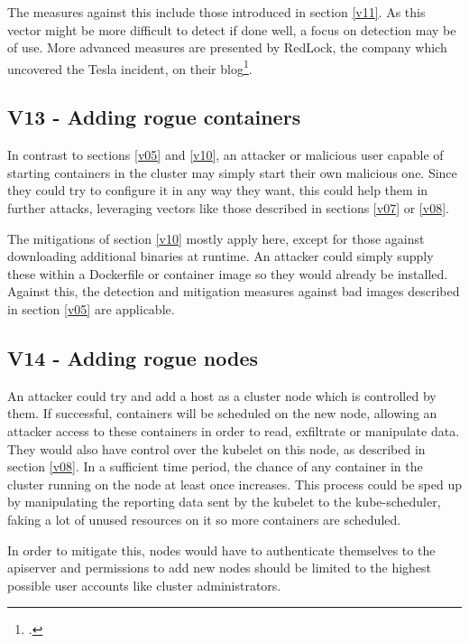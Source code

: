 The measures against this include those introduced in section \ref{v11}. As this vector might be more difficult to detect if done well, a focus on detection may be of use.
More advanced measures are presented by RedLock, the company which uncovered the Tesla incident, on their blog\footcite[][, section 'Preventing Such Compromises']{teslaIncident}.

\subsection{V13 - Adding rogue containers} \label{v13}
In contrast to sections \ref{v05} and \ref{v10}, an attacker or malicious user capable of starting containers in the cluster may simply start their own malicious one. Since they could try to configure it in any way they want, this could help them in further attacks, leveraging vectors like those described in sections \ref{v07} or \ref{v08}.

The mitigations of section \ref{v10} mostly apply here, except for those against downloading additional binaries at runtime. An attacker could simply supply these within a Dockerfile or container image so they would already be installed. Against this, the detection and mitigation measures against bad images described in section \ref{v05} are applicable.

\subsection{V14 - Adding rogue nodes}
An attacker could try and add a host as a cluster node which is controlled by them. If successful, containers will be scheduled on the new node, allowing an attacker access to these containers in order to read, exfiltrate or manipulate data. They would also have control over the kubelet on this node, as described in section \ref{v08}.
In a sufficient time period, the chance of any container in the cluster running on the node at least once increases. This process could be sped up by manipulating the reporting data sent by the kubelet to the kube-scheduler, faking a lot of unused resources on it so more containers are scheduled.

In order to mitigate this, nodes would have to authenticate themselves to the apiserver and permissions to add new nodes should be limited to the highest possible user accounts like cluster administrators.

